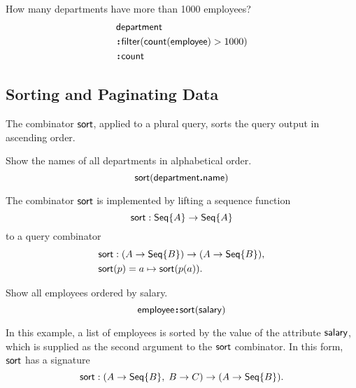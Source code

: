 \begin{demo}
    \label{ex:filter-by-size-and-count}
    How many departments have more than 1000 employees?
    \begin{align*}
        & \mathsf{department} \\
        & \!\boldsymbol{:}\!\mathsf{filter}(\mathsf{count}(\mathsf{employee})>1000) \\
        & \!\boldsymbol{:}\!\mathsf{count}
    \end{align*}
\end{demo}

\subsection*{Sorting and Paginating Data}

The combinator $\mathsf{sort}$, applied to a plural query, sorts the query output in
ascending order.

\begin{demo}
    \label{ex:sort-department-name}
    Show the names of all departments in alphabetical order.
    \begin{equation*}
        \mathsf{sort}(\mathsf{department}\boldsymbol{.}\mathsf{name})
    \end{equation*}
\end{demo}

The combinator $\mathsf{sort}$ is implemented by lifting a sequence function
\begin{equation*}
    \mathsf{sort} : \mathsf{Seq}{\left\{A\right\}} \to \mathsf{Seq}{\left\{A\right\}}
\end{equation*}
to a query combinator
\begin{align*}
    & \mathsf{sort} : (A \to \mathsf{Seq}{\left\{B\right\}}) \to (A \to \mathsf{Seq}{\left\{B\right\}}), \\
    & \mathsf{sort}(p) = a \mapsto \mathsf{sort}(p(a)).
\end{align*}

\begin{demo}
    \label{ex:sort-employee-by-salary}
    Show all employees ordered by salary.
    \begin{equation*}
        \mathsf{employee}\!\boldsymbol{:}\!\mathsf{sort}(\mathsf{salary})
    \end{equation*}
\end{demo}

In this example, a list of employees is sorted by the value of the attribute
$\mathsf{salary}$, which is supplied as the second argument to the $\mathsf{sort}$ combinator.
In this form, $\mathsf{sort}$ has a signature
\begin{equation*}
    \mathsf{sort} : (A \to \mathsf{Seq}{\left\{B\right\}},\; B \to C) \to (A \to \mathsf{Seq}{\left\{B\right\}}).
\end{equation*}

